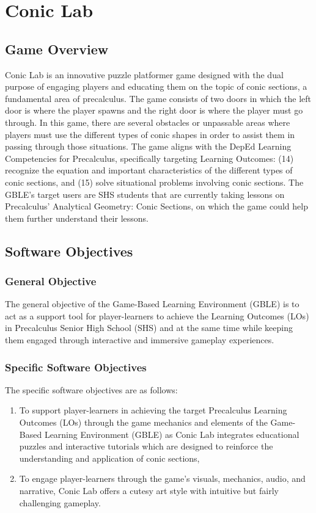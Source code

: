 \chapter{Conic Lab}
\label{sec:coniclab}
\section{Game Overview}
\label{sec:gameoverview}
Conic Lab is an innovative puzzle platformer game designed with the dual purpose of engaging players and educating them on the topic of conic sections, a fundamental area of precalculus. The game consists of two doors in which the left door is where the player spawns and the right door is where the player must go through. In this game, there are several obstacles or unpassable areas where players must use the different types of conic shapes in order to assist them in passing through those situations. The game aligns with the DepEd Learning Competencies for Precalculus, specifically targeting Learning Outcomes: (14) recognize the equation and important characteristics of the different types of conic sections, and (15) solve situational problems involving conic sections. The GBLE’s target users are SHS students that are currently taking lessons on Precalculus’ Analytical Geometry: Conic Sections, on which the game could help them further understand their lessons.

\section{Software Objectives}
\label{sec:softwareobjectives}
\subsection{General Objective}
\label{sec:genobjective}
The general objective of the Game-Based Learning Environment (GBLE) is to act as a support tool for player-learners to achieve the Learning Outcomes (LOs) in Precalculus Senior High School (SHS) and at the same time while keeping them engaged through interactive and immersive gameplay experiences.

\subsection{Specific Software Objectives}
\label{sec:specsoftwareobjectives}
The specific software objectives are as follows:
\begin{enumerate}
    \item To support player-learners in achieving the target Precalculus Learning Outcomes (LOs) through the game mechanics and elements of the Game-Based Learning Environment (GBLE) as Conic Lab integrates educational puzzles and interactive tutorials which are designed to reinforce the understanding and application of conic sections,
    \item To engage player-learners through the game’s visuals, mechanics, audio, and narrative, Conic Lab offers a cutesy art style with intuitive but fairly challenging gameplay.
\end{enumerate}


